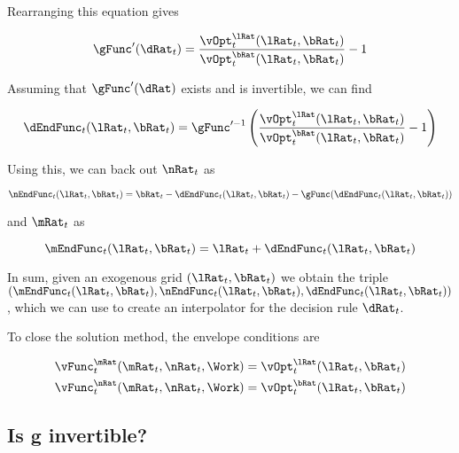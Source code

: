 \documentclass[\econtexRoot/SequentialEGM]{subfiles}
\begin{document}
Rearranging this equation gives

\begin{equation}
        \gFunc'(\dRat_{t}) = \frac{\vOpt_{t}^{\lRat}(\lRat_{t},
                \bRat_{t})}{\vOpt_{t}^{\bRat}(\lRat_{t}, \bRat_{t})} - 1
\end{equation}

Assuming that $\gFunc'(\dRat)$ exists and is invertible, we can find

\begin{equation}
        \dEndFunc_{t}(\lRat_{t}, \bRat_{t}) = \gFunc'^{-1}\left(
        \frac{\vOpt_{t}^{\lRat}(\lRat_{t},
                \bRat_{t})}{\vOpt_{t}^{\bRat}(\lRat_{t},
                \bRat_{t})} - 1 \right)
\end{equation}

Using this, we can back out $\nRat_{t}$ as

\begin{equation}
        \nEndFunc_{t}(\lRat_{t}, \bRat_{t}) = \bRat_{t} -
        \dEndFunc_{t}(\lRat_{t}, \bRat_{t}) - \gFunc(\dEndFunc_{t}(\lRat_{t},
                \bRat_{t}))
\end{equation}

and $\mRat_{t}$ as

\begin{equation}
        \mEndFunc_{t}(\lRat_{t}, \bRat_{t}) = \lRat_{t} +
        \dEndFunc_{t}(\lRat_{t}, \bRat_{t})
\end{equation}

In sum, given an exogenous grid $(\lRat_{t}, \bRat_{t})$ we obtain the triple
$\left(\mEndFunc_{t}(\lRat_{t}, \bRat_{t}), \nEndFunc_{t}(\lRat_{t},
                \bRat_{t}), \dEndFunc_{t}(\lRat_{t}, \bRat_{t})\right)$, which
we can use to
create an interpolator for the decision rule $\dRat_{t}$.

To close the solution method, the envelope conditions are

\begin{equation}
        \begin{split}
                \vFunc_{t}^{\mRat}(\mRat_{t}, \nRat_{t}, \Work) & =
                \vOpt_{t}^{\lRat}(\lRat_{t}, \bRat_{t}) \\
                \vFunc_{t}^{\nRat}(\mRat_{t}, \nRat_{t}, \Work) & =
                \vOpt_{t}^{\bRat}(\lRat_{t}, \bRat_{t})
        \end{split}
\end{equation}

\subsection{Is g invertible?}
\end{document}
